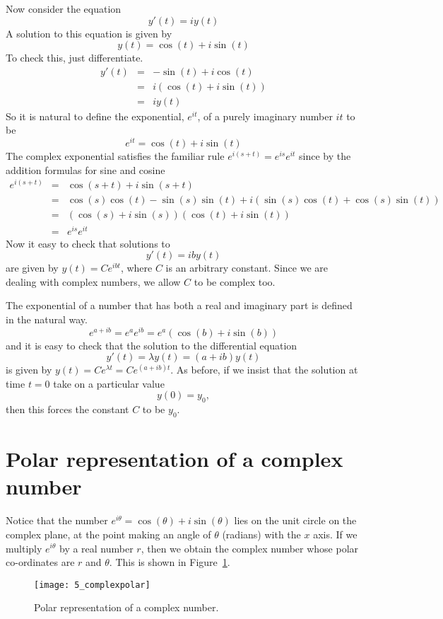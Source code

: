 Now consider the equation
\[
y'(t) = iy(t)
\]
A solution to this equation is given by
\[
y(t) = \cos(t) + i \sin(t)
\]
To check this, just differentiate.
\begin{eqnarray*}
y'(t) &=& -\sin(t) + i \cos(t)  \\
&=& i(\cos(t) + i \sin(t)) \\
&=& iy(t)
\end{eqnarray*}
So it is natural to define the exponential, $e^{it}$, of a purely
imaginary number $it$ to be
\[
e^{it} = \cos(t) + i \sin(t)
\]
The complex exponential satisfies the familiar rule
$e^{i(s+t)}=e^{is}e^{it}$ since by the addition formulas for sine and
cosine
\begin{eqnarray*}
e^{i(s+t)} &=& \cos(s+t) + i \sin(s+t) \\
&=&\cos(s)\cos(t)-\sin(s)\sin(t) + i(\sin(s)\cos(t)+\cos(s)\sin(t)) \\
&=&(\cos(s) + i \sin(s))(\cos(t) + i \sin(t)) \\
&=&e^{is}e^{it} 
\end{eqnarray*}
Now it easy to check that solutions to
\[
y'(t) = ib y(t)
\]
are given by $y(t) = C e^{ib t}$, where $C$ is an arbitrary
constant. Since we are dealing with complex numbers, we allow $C$ to
be complex too.

The exponential of a number that has both a real and imaginary part is
defined in the natural way.
\[
e^{a+ib} = e^ae^{ib} = e^a(\cos(b)+i\sin(b))
\]
and it is easy to check that the solution to the differential equation
\[
y'(t) = \lambda y(t) = (a+ib)y(t)
\]
is given by $y(t)=Ce^{\lambda t}=Ce^{(a+ib)t}$. As before, if we
insist that the solution at time $t=0$ take on a particular value
\[
y(0) = y_0,
\]
then this forces the constant $C$ to be $y_0$.

\section{Polar representation of a complex number}

Notice that the number $e^{i\theta}=\cos(\theta)+i\sin(\theta)$ lies
on the unit circle on the complex plane, at the point making an angle
of $\theta$ (radians) with the $x$ axis. If we multiply $e^{i\theta}$
by a real number $r$, then we obtain the complex number whose polar
co-ordinates are $r$ and $\theta$. This is shown in
Figure~\ref{fig_complexpolar}. 

\begin{figure}
\centerline{\texttt{[image: 5\_complexpolar]}}
\caption{Polar representation of a complex number.
\label{fig_complexpolar}}
\end{figure}

